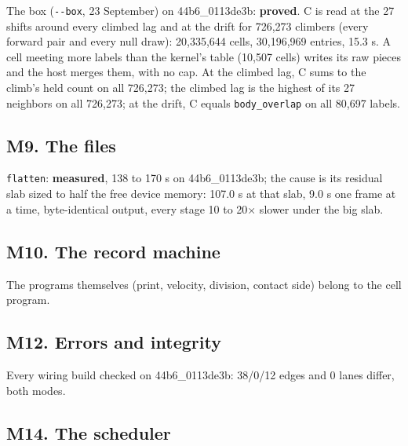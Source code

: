 The box (\texttt{-\allowbreak{}-\allowbreak{}box}, 23 September) on 44b6\_\allowbreak{}0113de3b: \textbf{proved}. C is read at the 27 shifts around every climbed lag and at the drift for 726,273 climbers (every forward pair and every null draw): 20,335,644 cells, 30,196,969 entries, 15.3 s. A cell meeting more labels than the kernel's table (10,507 cells) writes its raw pieces and the host merges them, with no cap. At the climbed lag, C sums to the climb's held count on all 726,273; the climbed lag is the highest of its 27 neighbors on all 726,273; at the drift, C equals \texttt{body\_\allowbreak{}overlap} on all 80,697 labels.

\subsection{\texorpdfstring{M9. The files}{M9. The files}}

\texttt{flatten}: \textbf{measured}, 138 to 170 s on 44b6\_\allowbreak{}0113de3b; the cause is its residual slab sized to half the free device memory: 107.0 s at that slab, 9.0 s one frame at a time, byte-identical output, every stage 10 to 20× slower under the big slab.

\subsection{\texorpdfstring{M10. The record machine}{M10. The record machine}}

The programs themselves (print, velocity, division, contact side) belong to the cell program.

\subsection{\texorpdfstring{M12. Errors and integrity}{M12. Errors and integrity}}

Every wiring build checked on 44b6\_\allowbreak{}0113de3b: 38/0/12 edges and 0 lanes differ, both modes.

\subsection{\texorpdfstring{M14. The scheduler}{M14. The scheduler}}


